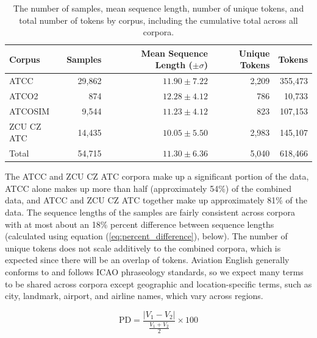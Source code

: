 \documentclass[12pt]{article}
\begin{document}
\begin{table}[!t]
    \centering
    \begin{tabular}{l r r r r}
        \toprule
        \textbf{Corpus} & \textbf{Samples} & \textbf{Mean Sequence Length (\(\pm \sigma\))} & \textbf{Unique Tokens} & \textbf{Tokens} \\
        \midrule
        ATCC            & 29,862           & \(11.90 \pm 7.22\)                             & 2,209                  & 355,473         \\
        ATCO2           & 874              & \(12.28 \pm 4.12\)                             & 786                    & 10,733          \\
        ATCOSIM         & 9,544            & \(11.23 \pm 4.12\)                             & 823                    & 107,153         \\
        ZCU CZ ATC      & 14,435           & \(10.05 \pm 5.50\)                             & 2,983                  & 145,107         \\
        \midrule
        Total           & 54,715           & \(11.30 \pm 6.36\)                             & 5,040                  & 618,466         \\
        \bottomrule
    \end{tabular}
    \caption{The number of samples, mean sequence length, number of unique tokens, and total number of tokens by corpus, including the cumulative
        total across all corpora.}
    \label{tab:corpora_stats}
\end{table}

The ATCC and ZCU CZ ATC corpora make up a significant portion of the data, ATCC alone makes up more than half (approximately 54\%) of the combined data, and ATCC and ZCU CZ ATC together make up approximately 81\% of the data. The sequence lengths of the samples are fairly consistent across corpora with at most about an 18\% percent difference between sequence lengths (calculated using equation (\ref{eq:percent_difference}), below). The number of unique tokens does not scale additively to the combined corpora, which is expected since there will be an overlap of tokens. Aviation English generally conforms to and follows ICAO phraseology standards, so we expect many terms to be shared across corpora except geographic and location-specific terms, such as city, landmark, airport, and airline names, which vary across regions.

\begin{equation}\label{eq:percent_difference}
    \mbox{PD} = \frac{|V_1 - V_2|}{\frac{V_1 + V_2}{2}} \times 100
\end{equation}
\end{document}
